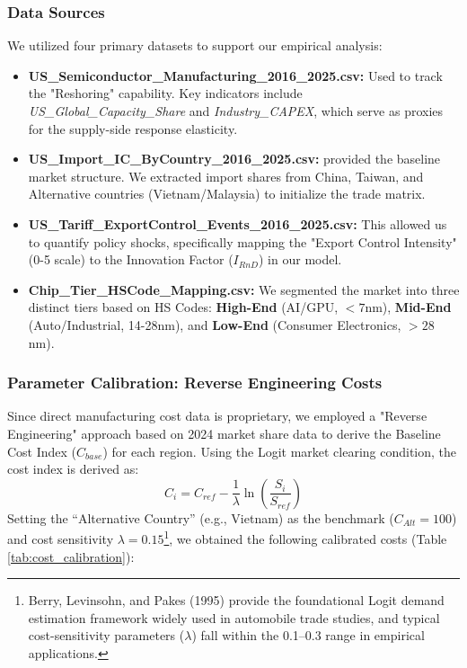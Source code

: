 \documentclass{apmcmthesis}
\begin{document}
\subsubsection{Data Sources}
We utilized four primary datasets to support our empirical analysis:
\begin{itemize}
    \item \textbf{US\_Semiconductor\_Manufacturing\_2016\_2025.csv:} Used to track the "Reshoring" capability. Key indicators include \textit{US\_Global\_Capacity\_Share} and \textit{Industry\_CAPEX}, which serve as proxies for the supply-side response elasticity.
    \item \textbf{US\_Import\_IC\_ByCountry\_2016\_2025.csv:} provided the baseline market structure. We extracted import shares from China, Taiwan, and Alternative countries (Vietnam/Malaysia) to initialize the trade matrix.
    \item \textbf{US\_Tariff\_ExportControl\_Events\_2016\_2025.csv:} This allowed us to quantify policy shocks, specifically mapping the "Export Control Intensity" (0-5 scale) to the Innovation Factor ($I_{RnD}$) in our model.
    \item \textbf{Chip\_Tier\_HSCode\_Mapping.csv:} We segmented the market into three distinct tiers based on HS Codes: \textbf{High-End} (AI/GPU, $<7$nm), \textbf{Mid-End} (Auto/Industrial, 14-28nm), and \textbf{Low-End} (Consumer Electronics, $>28$nm).
\end{itemize}

\subsubsection{Parameter Calibration: Reverse Engineering Costs}
Since direct manufacturing cost data is proprietary, we employed a "Reverse Engineering" approach based on 2024 market share data to derive the Baseline Cost Index ($C_{base}$) for each region.
Using the Logit market clearing condition, the cost index is derived as:
\begin{equation}
    C_i = C_{ref} - \frac{1}{\lambda} \ln \left( \frac{S_i}{S_{ref}} \right)
\end{equation}
Setting the ``Alternative Country'' (e.g., Vietnam) as the benchmark ($C_{Alt} = 100$) and cost sensitivity $\lambda = 0.15$\footnote{\cite{BLP1995} Berry, Levinsohn, and Pakes (1995) provide the foundational Logit demand estimation framework widely used in automobile trade studies, and typical cost-sensitivity parameters ($\lambda$) fall within the 0.1--0.3 range in empirical applications.}, we obtained the following calibrated costs (Table \ref{tab:cost_calibration}):
\end{document}
